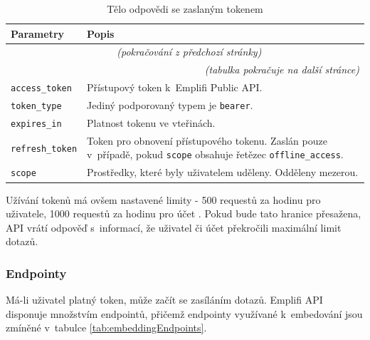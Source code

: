 \documentclass[czech, bc, kiv, he, iso690numb]{fasthesis}
\begin{document}
	\begin{longtable}{p{}p{}}
	\caption{Tělo odpovědi se zaslaným tokenem \cite{emplifiDocs}}
	\label{tab:exampleRequestResponse}\\
	\toprule[1.5pt]
	\textbf{Parametry} & \textbf{Popis}\\
	\midrule
	\endfirsthead
	\multicolumn{2}{c}{\tablename{}~\thetable{} \textit{(pokračování z předchozí stránky)}}\\
	\endhead
	\midrule
	\multicolumn{2}{r}{\textit{(tabulka pokračuje na další stránce)}}\\
	\endfoot
	\bottomrule[1.5pt]
	\endlastfoot
	\verb"access_token" & Přístupový token k~Emplifi Public API. \\
	\midrule
	\verb"token_type" & Jediný podporovaný typem je \texttt{bearer}. \\
	\midrule
	\verb"expires_in" & Platnost tokenu ve vteřinách. \\
	\midrule
	\verb"refresh_token" & Token pro obnovení přístupového tokenu. Zaslán pouze v~případě, pokud \verb"scope" obsahuje řetězec \texttt{offline\_access}.\\
	\midrule
	\verb"scope" & Prostředky, které byly uživatelem uděleny. Odděleny mezerou. \\
	\end{longtable}



Užívání tokenů má ovšem nastavené limity - 500 requestů za hodinu pro uživatele, 1000 requestů za hodinu pro účet \cite{emplifiDocs}. Pokud bude tato hranice přesažena,
API vrátí odpověď s~informací, že uživatel či účet překročili maximální limit dotazů.

\subsubsection{Endpointy}

Má-li uživatel platný token, může začít se zasíláním dotazů. Emplifi API disponuje množstvím endpointů, přičemž endpointy využívané k~embedování jsou zmíněné v~tabulce \ref{tab:embeddingEndpoints}. 
\end{document}
